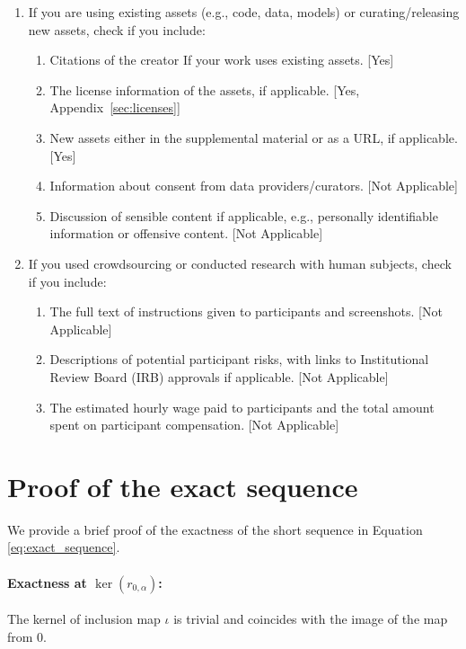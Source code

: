 \documentclass[twoside]{article}
\begin{document}
\begin{enumerate}
 \item If you are using existing assets (e.g., code, data, models) or curating/releasing new assets, check if you include:
 \begin{enumerate}
   \item Citations of the creator If your work uses existing assets. [Yes]
   \item The license information of the assets, if applicable. [Yes, Appendix~\ref{sec:licenses}]
   \item New assets either in the supplemental material or as a URL, if applicable. [Yes]
   \item Information about consent from data providers/curators. [Not Applicable]
   \item Discussion of sensible content if applicable, e.g., personally identifiable information or offensive content. [Not Applicable]
 \end{enumerate}

 \item If you used crowdsourcing or conducted research with human subjects, check if you include:
 \begin{enumerate}
   \item The full text of instructions given to participants and screenshots. [Not Applicable]
   \item Descriptions of potential participant risks, with links to Institutional Review Board (IRB) approvals if applicable. [Not Applicable]
   \item The estimated hourly wage paid to participants and the total amount spent on participant compensation. [Not Applicable]
 \end{enumerate}

 \end{enumerate}

\clearpage


\newpage

\onecolumn
\appendix

\section{Proof of the exact sequence}

We provide a brief proof of the exactness of the short sequence in Equation \ref{eq:exact_sequence}.
\paragraph{Exactness at \(\ker(r_{0,\alpha})\):} The kernel of inclusion map  \(\iota\) is trivial and coincides with the image of the map from 0. %
\end{document}
